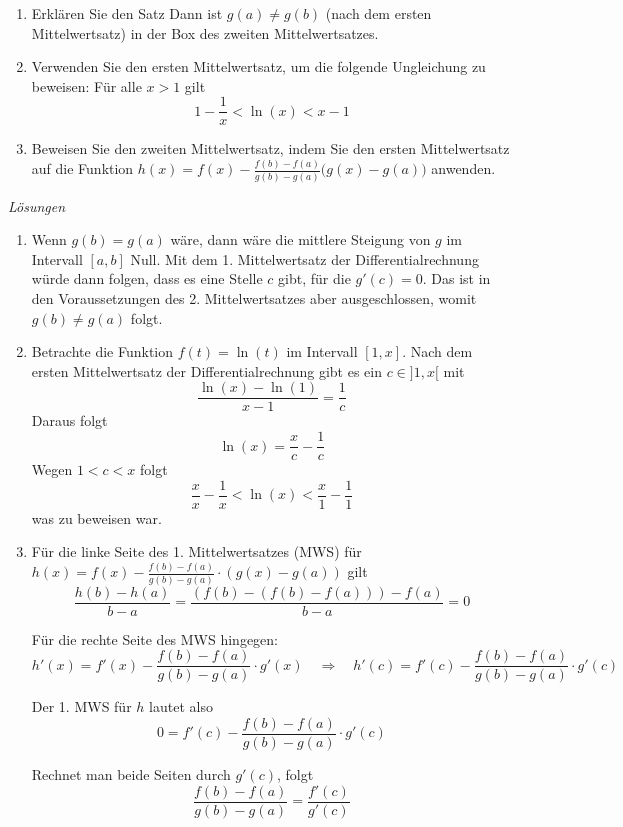 \begin{ueb}{}{}
    \begin{enumerate}
        \item Erklären Sie den Satz \glqq Dann ist $g(a)\neq g(b)$ (nach dem ersten Mittelwertsatz)\grqq{} in der Box des zweiten Mittelwertsatzes.
        \item Verwenden Sie den ersten Mittelwertsatz, um die folgende Ungleichung zu beweisen: Für alle $x>1$ gilt
        $$1 - \frac{1}{x} < \ln(x) < x-1$$
        \item Beweisen Sie den zweiten Mittelwertsatz, indem Sie den ersten Mittelwertsatz auf die Funktion $h(x) = f(x)-\frac{f(b)-f(a)}{g(b)-g(a)} \big( g(x)-g(a)\big)$ anwenden.

    \end{enumerate}

\end{ueb}
\clearpage
\emph{Lösungen}
\begin{enumerate}
    \item Wenn \( g(b) = g(a) \) wäre, dann wäre die mittlere Steigung von \( g \) im Intervall \([a, b]\) Null. Mit dem 1. Mittelwertsatz der Differentialrechnung würde dann folgen, dass es eine Stelle \( c \) gibt, für die \( g'(c) = 0 \). Das ist in den Voraussetzungen des 2. Mittelwertsatzes aber ausgeschlossen, womit \( g(b) \neq g(a) \) folgt.
    \item  Betrachte die Funktion \( f(t) = \ln(t) \) im Intervall \([1, x]\). Nach dem ersten Mittelwertsatz der Differentialrechnung gibt es ein \( c \in ]1, x[\) mit
    \[
    \frac{\ln(x) - \ln(1)}{x - 1} = \frac{1}{c}
    \]
    Daraus folgt
    \[
    \ln(x) = \frac{x}{c} - \frac{1}{c}
    \]
    Wegen \(1 < c < x\) folgt
    \[
    \frac{x}{x} - \frac{1}{x} < \ln(x) < \frac{x}{1} - \frac{1}{1}
    \]
    was zu beweisen war.
    \item Für die linke Seite des 1. Mittelwertsatzes (MWS) für \( h(x) = f(x) - \frac{f(b) - f(a)}{g(b) - g(a)} \cdot (g(x) - g(a)) \) gilt
    \[
    \frac{h(b) - h(a)}{b - a} = \frac{(f(b) - (f(b) - f(a))) - f(a)}{b - a} = 0
    \]
    
    Für die rechte Seite des MWS hingegen:
    \[
    h'(x) = f'(x) - \frac{f(b) - f(a)}{g(b) - g(a)} \cdot g'(x) \quad \Rightarrow \quad h'(c) = f'(c) - \frac{f(b) - f(a)}{g(b) - g(a)} \cdot g'(c)
    \]
    
    Der 1. MWS für \( h \) lautet also
    \[
    0 = f'(c) - \frac{f(b) - f(a)}{g(b) - g(a)} \cdot g'(c)
    \]
    
    Rechnet man beide Seiten durch \( g'(c) \), folgt
    \[
    \frac{f(b) - f(a)}{g(b) - g(a)} = \frac{f'(c)}{g'(c)}
    \]

    
    
\end{enumerate}